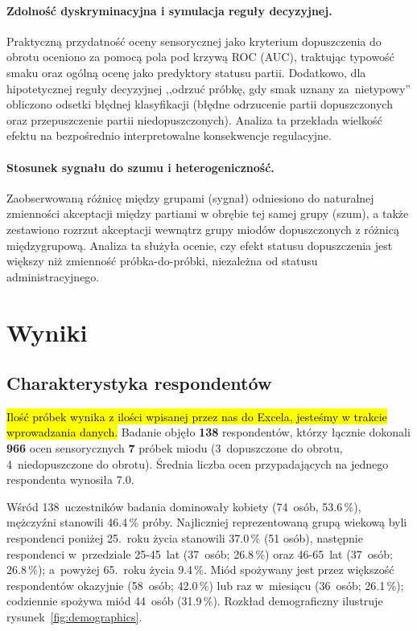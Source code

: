 \paragraph{Zdolność dyskryminacyjna i symulacja reguły decyzyjnej.}
Praktyczną przydatność oceny sensorycznej jako kryterium dopuszczenia do
obrotu oceniono za pomocą pola pod krzywą ROC (AUC), traktując typowość
smaku oraz ogólną ocenę jako predyktory statusu partii. Dodatkowo, dla
hipotetycznej reguły decyzyjnej ,,odrzuć próbkę, gdy smak uznany za~nietypowy''
obliczono odsetki błędnej klasyfikacji (błędne odrzucenie partii
dopuszczonych oraz przepuszczenie partii niedopuszczonych). Analiza ta
przekłada wielkość efektu na bezpośrednio interpretowalne konsekwencje
regulacyjne.


\paragraph{Stosunek sygnału do szumu i heterogeniczność.}
Zaobserwowaną różnicę między grupami (sygnał) odniesiono do naturalnej
zmienności akceptacji między partiami w obrębie tej samej grupy (szum),
a także zestawiono rozrzut akceptacji wewnątrz grupy miodów dopuszczonych
z różnicą międzygrupową. Analiza ta służyła ocenie, czy efekt statusu
dopuszczenia jest większy niż zmienność próbka-do-próbki, niezależna od
statusu administracyjnego.

\section{Wyniki}

\subsection{Charakterystyka respondentów}
\hl{Ilość próbek wynika z ilości wpisanej przez nas do Excela, jesteśmy w trakcie wprowadzania danych.}
Badanie objęło \textbf{138} respondentów, którzy łącznie
dokonali \textbf{966} ocen sensorycznych \textbf{7} próbek
miodu (3~dopuszczone do obrotu, 4~niedopuszczone
do obrotu).
Średnia liczba ocen przypadających na jednego respondenta wynosiła
7.0.


Wśród 138~uczestników badania dominowały kobiety
(74~osób, 53.6\,\%), mężczyźni stanowili
46.4\,\% próby.
Najliczniej reprezentowaną grupą wiekową byli respondenci poniżej 25.~roku
życia stanowili 37.0\,\% (51 osób), następnie respondenci w~przedziale 25-45~lat (37~osób; 26.8\,\%) oraz 46-65~lat
(37~osób; 26.8\,\%);  a~powyżej 65.~roku
życia 9.4\,\%.
Miód spożywany jest przez większość respondentów okazyjnie
(58~osób; 42.0\,\%)
lub raz w~miesiącu (36~osób; 26.1\,\%);
codziennie spożywa miód 44~osób (31.9\,\%).
Rozkład demograficzny ilustruje rysunek~\ref{fig:demographics}.

